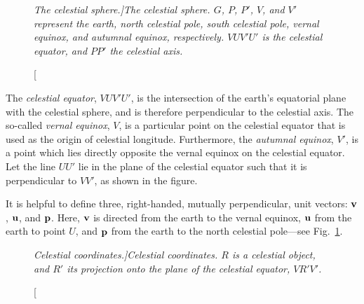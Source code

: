 \begin{figure}
\epsfysize=3in
\centerline{}
\caption[\em The celestial sphere.]{\em The celestial sphere. $G$, $P$, $P'$, $V$, and $V'$ represent the earth, north celestial
pole, south celestial pole, vernal equinox, and  autumnal equinox, respectively. $VUV'U'$ is the celestial equator, and $PP'$ the
celestial axis.}\label{f1}
\end{figure}

The {\em celestial equator}, $VUV'U'$, is the intersection of the earth's equatorial plane with the celestial
sphere, and is therefore
perpendicular to the celestial axis. The so-called {\em vernal equinox}, $V$, is a particular point on the
celestial equator that is used as the origin of celestial longitude. Furthermore, the {\em autumnal equinox}, $V'$,
is a point which lies directly opposite the vernal equinox on the celestial equator. Let the line $UU'$ lie in the plane of the celestial equator
such that it is perpendicular to $VV'$, as shown in the figure.

It is helpful to define  three, right-handed, mutually perpendicular, unit vectors: ${\bf v}$, 
${\bf u}$, and ${\bf p}$.
Here, ${\bf v}$ is directed from the earth to the vernal
equinox, ${\bf u}$ from the earth to point $U$, and ${\bf p}$ from the
earth to the north celestial pole---see Fig.~\ref{f1}.

\begin{figure}
\epsfysize=3in
\centerline{}
\caption[\em Celestial coordinates.]{\em Celestial coordinates. $R$ is a celestial object, and $R'$ its
projection onto the plane of the celestial equator, $VR'V'$.}\label{f2}
\end{figure}

